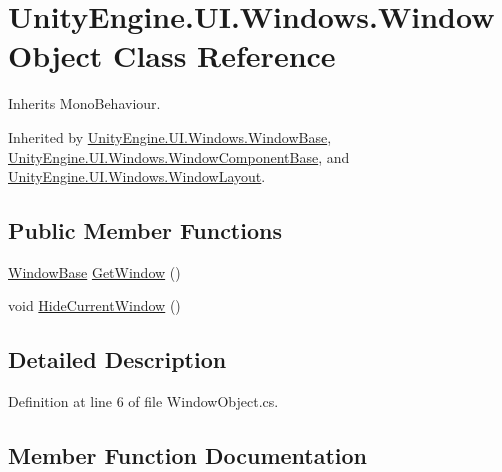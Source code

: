 \hypertarget{class_unity_engine_1_1_u_i_1_1_windows_1_1_window_object}{}\section{Unity\+Engine.\+U\+I.\+Windows.\+Window\+Object Class Reference}
\label{class_unity_engine_1_1_u_i_1_1_windows_1_1_window_object}


Inherits Mono\+Behaviour.



Inherited by \hyperlink{class_unity_engine_1_1_u_i_1_1_windows_1_1_window_base}{Unity\+Engine.\+U\+I.\+Windows.\+Window\+Base}, \hyperlink{class_unity_engine_1_1_u_i_1_1_windows_1_1_window_component_base}{Unity\+Engine.\+U\+I.\+Windows.\+Window\+Component\+Base}, and \hyperlink{class_unity_engine_1_1_u_i_1_1_windows_1_1_window_layout}{Unity\+Engine.\+U\+I.\+Windows.\+Window\+Layout}.

\subsection*{Public Member Functions}
\begin{DoxyCompactItemize}
\item 
\hyperlink{class_unity_engine_1_1_u_i_1_1_windows_1_1_window_base}{Window\+Base} \hyperlink{class_unity_engine_1_1_u_i_1_1_windows_1_1_window_object_a7571ee3322801e3874cc69b6fd21127b}{Get\+Window} ()
\item 
void \hyperlink{class_unity_engine_1_1_u_i_1_1_windows_1_1_window_object_aaf65f89fcba4c25d767be1fdadf7f7cf}{Hide\+Current\+Window} ()
\end{DoxyCompactItemize}


\subsection{Detailed Description}


Definition at line 6 of file Window\+Object.\+cs.



\subsection{Member Function Documentation}
\hypertarget{class_unity_engine_1_1_u_i_1_1_windows_1_1_window_object_a7571ee3322801e3874cc69b6fd21127b}{}
